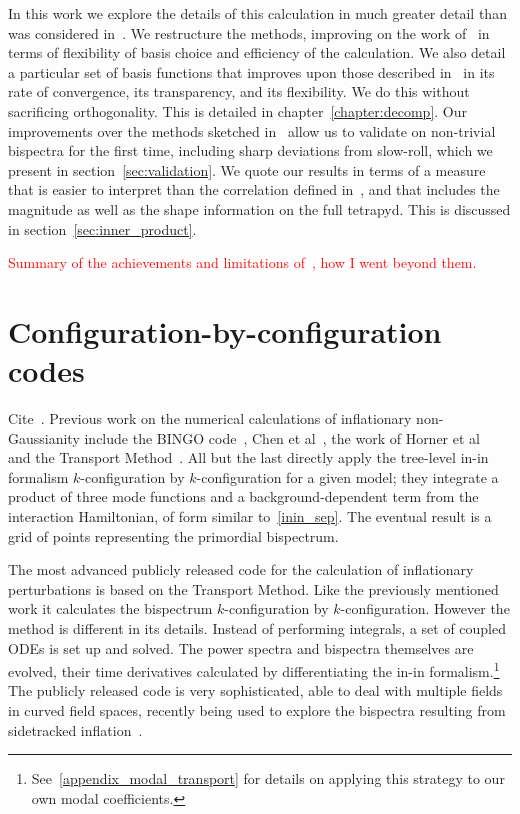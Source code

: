 In this work we explore the details of this calculation in much greater detail
than was considered in~\cite{Funakoshi}.
We restructure the methods, improving on the work of~\cite{Funakoshi} in terms
of flexibility of basis choice and efficiency of the calculation.
We also detail a particular set of basis functions that improves upon those described
in~\cite{Funakoshi} in its rate of convergence, its transparency,
and its flexibility.
We do this without sacrificing orthogonality.
This is detailed in chapter~\ref{chapter:decomp}.
Our improvements over the methods sketched in~\cite{Funakoshi} allow us to validate
on non-trivial bispectra for the first time, including sharp deviations from slow-roll, which we present in
section~\ref{sec:validation}.
We quote our results in terms of a measure that is
easier to interpret than the correlation defined in~\cite{Funakoshi},
and that includes the magnitude as well as the shape information
on the full tetrapyd.
This is discussed in section~\ref{sec:inner_product}.


    \textcolor{red}{Summary of the achievements and limitations of~\cite{Funakoshi}, how I went beyond them.}
    \section{Configuration-by-configuration codes}
    Cite~\cite{Ringeval}.
    Previous work on the numerical calculations of inflationary
non-Gaussianity include the BINGO code~\cite{BINGO},
Chen et al~\cite{chen_easther_lim_1,chen_easther_lim_2},
the work of Horner et al~\cite{horner_methods,horner_ng,horner_cs}
and the Transport Method~\cite{transport_main,transport_pytransport,transport_pytransport_2,transport_curved_3_point}.
All but the last directly apply the tree-level in-in formalism $k$-configuration by $k$-configuration for a given model;
they integrate a product of three mode functions and a background-dependent term from the interaction Hamiltonian, of form similar to~\eqref{inin_sep}.
The eventual result is a grid of points representing the primordial bispectrum.


The most advanced publicly released code for the calculation of inflationary perturbations
is based on the Transport Method.
Like the previously mentioned work it calculates the bispectrum $k$-configuration by $k$-configuration.
However the method is different in its details.
Instead of performing integrals,
a set of coupled ODEs is set up and solved.
The power spectra and bispectra themselves are evolved, their time derivatives calculated by
differentiating the in-in formalism.\footnote{See~\ref{appendix_modal_transport}
    for details on applying this strategy to our own modal coefficients.
    }
The publicly released code is very sophisticated,
able to deal with multiple fields in curved field spaces,
recently being used to explore the bispectra resulting from
sidetracked inflation~\cite{RP_1}.
